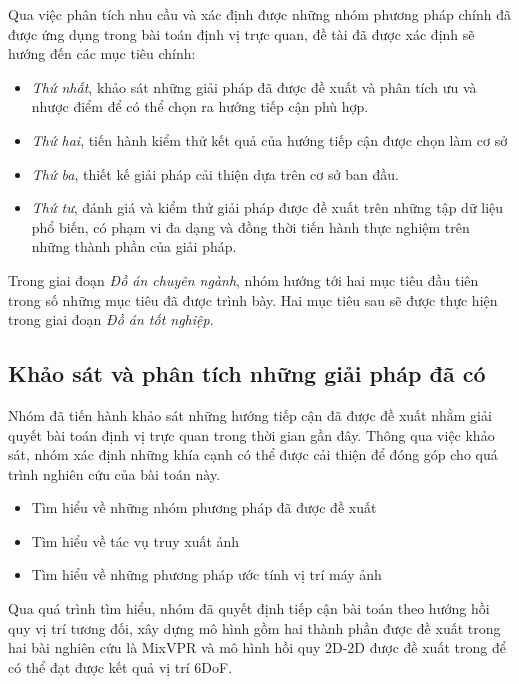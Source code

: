 Qua việc phân tích nhu cầu và xác định được những nhóm phương pháp chính đã được ứng dụng trong bài toán định vị trực quan, đề tài đã được xác định sẽ hướng đến các mục tiêu chính:

\begin{itemize}
    \item \textit{Thứ nhất}, khảo sát những giải pháp đã được đề xuất và phân tích ưu và nhược điểm để có thể chọn ra hướng tiếp cận phù hợp.
    \item \textit{Thứ hai}, tiến hành kiểm thử kết quả của hướng tiếp cận được chọn làm cơ sở
    \item \textit{Thứ ba}, thiết kế giải pháp cải thiện dựa trên cơ sở ban đầu.
    \item \textit{Thứ tư}, đánh giá và kiểm thử giải pháp được đề xuất trên những tập dữ liệu phổ biến, có phạm vi đa dạng và đồng thời tiến hành thực nghiệm trên những thành phần của giải pháp.
\end{itemize}

Trong giai đoạn \textit{Đồ án chuyên ngành}, nhóm hướng tới hai mục tiêu đầu tiên trong số những mục tiêu đã được trình bày. Hai mục tiêu sau sẽ được thực hiện trong giai đoạn \textit{Đồ án tốt nghiệp}.

\subsection{Khảo sát và phân tích những giải pháp đã có}
Nhóm đã tiến hành khảo sát những hướng tiếp cận đã được đề xuất nhằm giải quyết bài toán định vị trực quan trong thời gian gần đây. Thông qua việc khảo sát, nhóm xác định những khía cạnh có thể được cải thiện để đóng góp cho quá trình nghiên cứu của bài toán này.
\begin{itemize}
    \item Tìm hiểu về những nhóm phương pháp đã được đề xuất
    \item Tìm hiểu về tác vụ truy xuất ảnh
    \item Tìm hiểu về những phương pháp ước tính vị trí máy ảnh
\end{itemize}

Qua quá trình tìm hiểu, nhóm đã quyết định tiếp cận bài toán theo hướng hồi quy vị trí tương đối, xây dựng mô hình gồm hai thành phần được đề xuất trong hai bài nghiên cứu là MixVPR \cite{alibey2023mixvpr} và mô hình hồi quy 2D-2D được đề xuất trong \cite{arnold2022mapfree} để có thể đạt được kết quả vị trí 6DoF.

